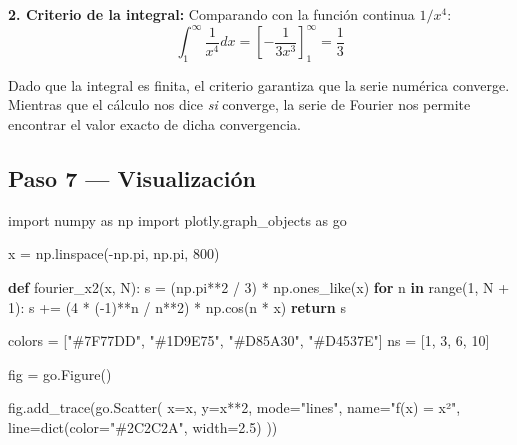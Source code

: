 \documentclass[
  letterpaper,
  DIV=11,
  numbers=noendperiod]{scrreprt}
\newenvironment{Shaded}{\begin{snugshade}}{\end{snugshade}}
\newcommand{\BuiltInTok}[1]{\textcolor[rgb]{0.00,0.23,0.31}{#1}}
\newcommand{\ControlFlowTok}[1]{\textcolor[rgb]{0.00,0.23,0.31}{\textbf{#1}}}
\newcommand{\DecValTok}[1]{\textcolor[rgb]{0.68,0.00,0.00}{#1}}
\newcommand{\FloatTok}[1]{\textcolor[rgb]{0.68,0.00,0.00}{#1}}
\newcommand{\ImportTok}[1]{\textcolor[rgb]{0.00,0.46,0.62}{#1}}
\newcommand{\KeywordTok}[1]{\textcolor[rgb]{0.00,0.23,0.31}{\textbf{#1}}}
\newcommand{\NormalTok}[1]{\textcolor[rgb]{0.00,0.23,0.31}{#1}}
\newcommand{\OperatorTok}[1]{\textcolor[rgb]{0.37,0.37,0.37}{#1}}
\newcommand{\StringTok}[1]{\textcolor[rgb]{0.13,0.47,0.30}{#1}}
\begin{document}
\textbf{2. Criterio de la integral:} Comparando con la función continua
\(1/x^4\):
\[\int_{1}^{\infty} \frac{1}{x^4} dx = \left[ -\frac{1}{3x^3} \right]_1^{\infty} = \frac{1}{3}\]

Dado que la integral es finita, el criterio garantiza que la serie
numérica converge. Mientras que el cálculo nos dice \emph{si} converge,
la serie de Fourier nos permite encontrar el valor exacto de dicha
convergencia.

\subsection{Paso 7 --- Visualización}\label{paso-7-visualizaciuxf3n}

\begin{Shaded}
\begin{Highlighting}[]
\ImportTok{import}\NormalTok{ numpy }\ImportTok{as}\NormalTok{ np}
\ImportTok{import}\NormalTok{ plotly.graph\_objects }\ImportTok{as}\NormalTok{ go}

\NormalTok{x }\OperatorTok{=}\NormalTok{ np.linspace(}\OperatorTok{{-}}\NormalTok{np.pi, np.pi, }\DecValTok{800}\NormalTok{)}

\KeywordTok{def}\NormalTok{ fourier\_x2(x, N):}
\NormalTok{    s }\OperatorTok{=}\NormalTok{ (np.pi}\OperatorTok{**}\DecValTok{2} \OperatorTok{/} \DecValTok{3}\NormalTok{) }\OperatorTok{*}\NormalTok{ np.ones\_like(x)}
    \ControlFlowTok{for}\NormalTok{ n }\KeywordTok{in} \BuiltInTok{range}\NormalTok{(}\DecValTok{1}\NormalTok{, N }\OperatorTok{+} \DecValTok{1}\NormalTok{):}
\NormalTok{        s }\OperatorTok{+=}\NormalTok{ (}\DecValTok{4} \OperatorTok{*}\NormalTok{ (}\OperatorTok{{-}}\DecValTok{1}\NormalTok{)}\OperatorTok{**}\NormalTok{n }\OperatorTok{/}\NormalTok{ n}\OperatorTok{**}\DecValTok{2}\NormalTok{) }\OperatorTok{*}\NormalTok{ np.cos(n }\OperatorTok{*}\NormalTok{ x)}
    \ControlFlowTok{return}\NormalTok{ s}

\NormalTok{colors }\OperatorTok{=}\NormalTok{ [}\StringTok{"\#7F77DD"}\NormalTok{, }\StringTok{"\#1D9E75"}\NormalTok{, }\StringTok{"\#D85A30"}\NormalTok{, }\StringTok{"\#D4537E"}\NormalTok{]}
\NormalTok{ns     }\OperatorTok{=}\NormalTok{ [}\DecValTok{1}\NormalTok{, }\DecValTok{3}\NormalTok{, }\DecValTok{6}\NormalTok{, }\DecValTok{10}\NormalTok{]}

\NormalTok{fig }\OperatorTok{=}\NormalTok{ go.Figure()}

\NormalTok{fig.add\_trace(go.Scatter(}
\NormalTok{    x}\OperatorTok{=}\NormalTok{x, y}\OperatorTok{=}\NormalTok{x}\OperatorTok{**}\DecValTok{2}\NormalTok{,}
\NormalTok{    mode}\OperatorTok{=}\StringTok{"lines"}\NormalTok{, name}\OperatorTok{=}\StringTok{"f(x) = x²"}\NormalTok{,}
\NormalTok{    line}\OperatorTok{=}\BuiltInTok{dict}\NormalTok{(color}\OperatorTok{=}\StringTok{"\#2C2C2A"}\NormalTok{, width}\OperatorTok{=}\FloatTok{2.5}\NormalTok{)}
\NormalTok{))}


\end{Highlighting}
\end{Shaded}
\end{document}
